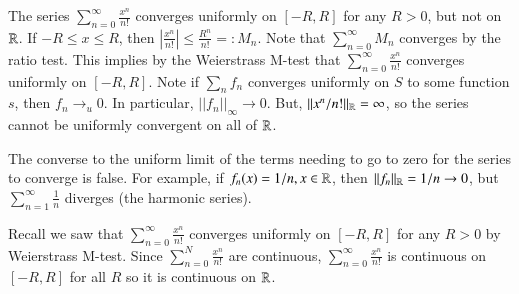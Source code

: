 \begin{example}
    The series $\sum_{n=0}^{\infty}\frac{x^n}{n!}$ converges uniformly on $[-R,R]$ for any $R > 0$, but not on $\mathbb R$. If $-R \leq x \leq R$, then $\left|\frac{x^n}{n!}\right| \leq \frac{R^n}{n!} =: M_n$. Note that $\sum_{n=0}^{\infty}M_n$ converges by the ratio test. This implies by the Weierstrass M-test that $\sum_{n=0}^{\infty}\frac{x^n}{n!}$ converges uniformly on $[-R,R]$. Note if $\sum_nf_n$ converges uniformly on $S$ to some function $s$, then $f_n\rightarrow_u 0$. In particular, $||f_n||_{\infty}\rightarrow 0$. But, $||x^n/n!||_{\mathbb R} = \infty$, so the series cannot be uniformly convergent on all of $\mathbb R$.
\end{example}

The converse to the uniform limit of the terms needing to go to zero for the series to converge is false. For example, if $f_n(x) = 1/n, x \in \mathbb R$, then $||f_n||_{\mathbb R} = 1/n\rightarrow 0$, but $\sum_{n=1}^{\infty}\frac{1}{n}$ diverges (the harmonic series).

\begin{example}
    Recall we saw that $\sum_{n=0}^{\infty}\frac{x^n}{n!}$ converges uniformly on $[-R,R]$ for any $R > 0$ by Weierstrass M-test. Since $\sum_{n=0}^N\frac{x^n}{n!}$ are continuous, $\sum_{n=0}^{\infty}\frac{x^n}{n!}$ is continuous on $[-R,R]$ for all $R$ so it is continuous on $\mathbb R$.
\end{example}


